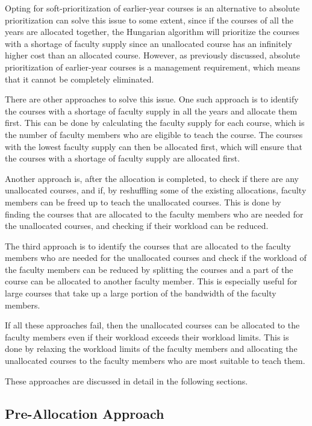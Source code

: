 Opting for soft-prioritization of earlier-year courses is an alternative to absolute prioritization can solve this issue to some extent, since if the courses of all the years are allocated together, the Hungarian algorithm will prioritize the courses with a shortage of faculty supply since an unallocated course has an infinitely higher cost than an allocated course. However, as previously discussed, absolute prioritization of earlier-year courses is a management requirement, which means that it cannot be completely eliminated.

There are other approaches to solve this issue. One such approach is to identify the courses with a shortage of faculty supply in all the years and allocate them first. This can be done by calculating the faculty supply for each course, which is the number of faculty members who are eligible to teach the course. The courses with the lowest faculty supply can then be allocated first, which will ensure that the courses with a shortage of faculty supply are allocated first.

Another approach is, after the allocation is completed, to check if there are any unallocated courses, and if, by reshuffling some of the existing allocations, faculty members can be freed up to teach the unallocated courses. This is done by finding the courses that are allocated to the faculty members who are needed for the unallocated courses, and checking if their workload can be reduced.

The third approach is to identify the courses that are allocated to the faculty members who are needed for the unallocated courses and check if the workload of the faculty members can be reduced by splitting the courses and a part of the course can be allocated to another faculty member. This is especially useful for large courses that take up a large portion of the bandwidth of the faculty members.

If all these approaches fail, then the unallocated courses can be allocated to the faculty members even if their workload exceeds their workload limits. This is done by relaxing the workload limits of the faculty members and allocating the unallocated courses to the faculty members who are most suitable to teach them.

These approaches are discussed in detail in the following sections.

\subsection{Pre-Allocation Approach}
\label{sec:pre_allocation}

